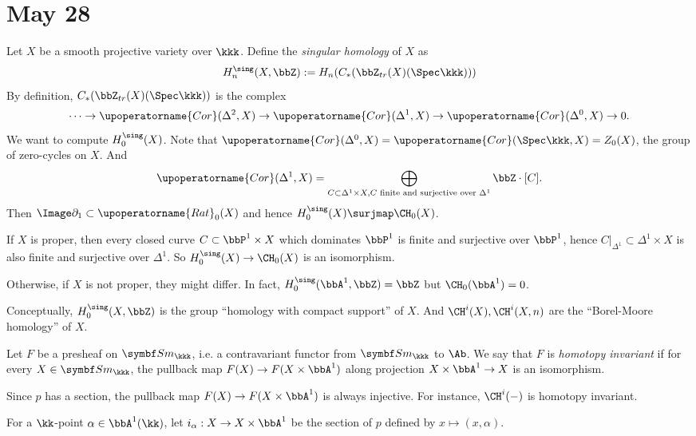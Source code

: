 \section{May 28}


  \begin{example}
    Let $X$ be a smooth projective variety over $\kkk$.
    Define the \emph{singular homology} of $X$ as
    \[ H_n^{\sing}(X,\bbZ) := H_n(C_*(\bbZ_{tr}(X)(\Spec \kkk))) \]
    By definition, $C_*(\bbZ_{tr}(X)(\Spec \kkk))$ is the complex
    \[ \cdots \to \upoperatorname{Cor}(\Delta^2, X) \to \upoperatorname{Cor}(\Delta^1, X) \to \upoperatorname{Cor}(\Delta^0, X) \to 0. \]
    We want to compute $H_0^{\sing}(X)$.
    Note that $\upoperatorname{Cor}(\Delta^0, X) = \upoperatorname{Cor}(\Spec \kkk, X) = Z_0(X)$, the group of zero-cycles on $X$.
    And 
    \[ \upoperatorname{Cor}(\Delta^1, X) = \bigoplus_{C \subset \Delta^1 \times X, C \text{ finite and surjective over } \Delta^1} \bbZ \cdot [C]. \]
    Then $\Image \partial_1 \subset \upoperatorname{Rat}_0(X)$ and hence $H_0^{\sing}(X) \surjmap \CH_0(X)$.

    If $X$ is proper, then every closed curve $C \subset \bbP^1 \times X$ which dominates $\bbP^1$ is finite and surjective over $\bbP^1$,
    hence $C|_{\Delta^1} \subset \Delta^1 \times X$ is also finite and surjective over $\Delta^1$.
    So $H_0^{\sing}(X) \to \CH_0(X)$ is an isomorphism.

    Otherwise, if $X$ is not proper, they might differ.
    In fact, $H_0^{\sing}(\bbA^1,\bbZ) = \bbZ$ but $\CH_0(\bbA^1) = 0$.

    Conceptually, $H_0^{\sing}(X,\bbZ)$ is the group ``homology with compact support'' of $X$.
    And $\CH^i(X), \CH^i(X,n)$ are the ``Borel-Moore homology'' of $X$.
  \end{example}

  \begin{definition}
    Let $F$ be a presheaf on $\Sm_{\kkk}$, i.e. a contravariant functor from $\Sm_{\kkk}$ to $\Ab$.
    We say that $F$ is \emph{homotopy invariant} if for every $X \in \Sm_{\kkk}$, the pullback map $F(X) \to F(X \times \bbA^1)$ along projection $X \times \bbA^1 \to X$ is an isomorphism.
  \end{definition}

  Since $p$ has a section, the pullback map $F(X) \to F(X \times \bbA^1)$ is always injective.
  For instance, $\CH^i(-)$ is homotopy invariant.

  For a $\kk$-point $\alpha \in \bbA^1(\kk)$, let $i_\alpha: X \to X \times \bbA^1$ be the section of $p$ defined by $x \mapsto (x, \alpha)$.
  
